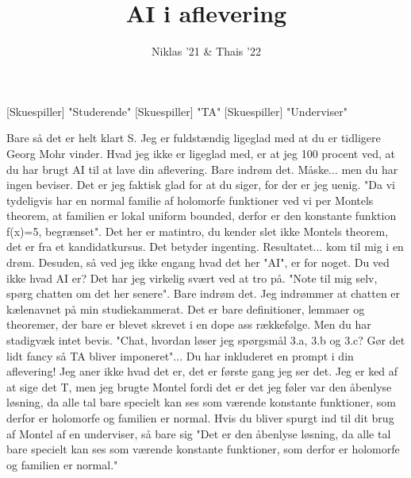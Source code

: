 \documentclass[a4paper,11pt]{article}
\title{AI i aflevering}
\author{Niklas '21 \& Thais '22}
\begin{document}
\maketitle

\begin{roles}
[Skuespiller] "Studerende"
[Skuespiller] "TA"
[Skuespiller] "Underviser"
\end{roles}

\begin{sketch}
 Bare så det er helt klart S. Jeg er fuldstændig ligeglad med at du er tidligere Georg Mohr vinder. Hvad jeg ikke er ligeglad med, er at jeg 100 procent ved, at du har brugt AI til at lave din aflevering.
 Bare indrøm det.
 Måske... men du har ingen beviser.
 Det er jeg faktisk glad for at du siger, for der er jeg uenig.
 "Da vi tydeligvis har en normal familie af holomorfe funktioner ved vi per Montels theorem, at familien er lokal uniform bounded, derfor er den konstante funktion f(x)=5, begrænset". Det her er matintro, du kender slet ikke Montels theorem, det er fra et kandidatkursus.
 Det betyder ingenting. Resultatet... kom til mig i en drøm. Desuden, så ved jeg ikke engang hvad det her "AI", er for noget.
 Du ved ikke hvad AI er? Det har jeg virkelig svært ved at tro på.
 "Note til mig selv, spørg chatten om det her senere". Bare indrøm det.
 Jeg indrømmer at chatten er kælenavnet på min studiekammerat.
 Det er bare definitioner, lemmaer og theoremer, der bare er blevet skrevet i en dope ass rækkefølge. Men du har stadigvæk intet bevis.
 "Chat, hvordan løser jeg spørgsmål 3.a, 3.b og 3.c? Gør det lidt fancy så TA bliver imponeret"... Du har inkluderet en prompt i din aflevering!
 Jeg aner ikke hvad det er, det er første gang jeg ser det.
 Jeg er ked af at sige det T, men jeg brugte Montel fordi det er det jeg føler var den åbenlyse løsning, da alle tal bare specielt kan ses som værende konstante funktioner, som derfor er holomorfe og familien er normal.
 Hvis du bliver spurgt ind til dit brug af Montel af en underviser, så bare sig "Det er den åbenlyse løsning, da alle tal bare specielt kan ses som værende konstante funktioner, som derfor er holomorfe og familien er normal."

\end{sketch}
\end{document}
